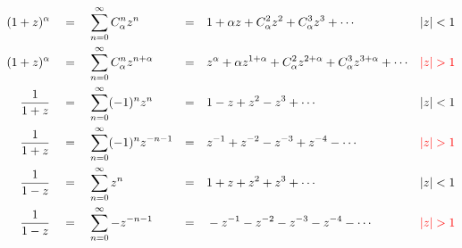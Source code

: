 \begin{align*}
    (1+z)^{\alpha} \quad&=\quad \sum_{n=0}^{\infty} C_\alpha^nz^n &=&\quad 1+\alpha z+C_\alpha^2z^2+C_\alpha^3z^3+\cdots & |z|<1 \\
    (1+z)^{\alpha} \quad&=\quad \sum_{n=0}^{\infty} C_\alpha^nz^{n+\alpha} &=&\quad z^{\alpha}+\alpha z^{1+\alpha}+C_\alpha^2z^{2+\alpha}+C_\alpha^3z^{3+\alpha}+\cdots & {\color{red}|z|>1} \\
    \frac{1}{1+z} \quad&=\quad \sum_{n=0}^{\infty}(-1)^nz^n &=&\quad 1-z+z^2-z^3+\cdots & |z|<1 \\
    \frac{1}{1+z} \quad&=\quad \sum_{n=0}^{\infty}(-1)^nz^{-n-1} &=&\quad z^{-1}+z^{-2}-z^{-3}+z^{-4}-\cdots & {\color{red}|z|>1} \\
    \frac{1}{1-z} \quad&=\quad \sum_{n=0}^{\infty}z^n &=&\quad 1+z+z^2+z^3+\cdots & |z|<1 \\
    \frac{1}{1-z} \quad&=\quad \sum_{n=0}^{\infty}-z^{-n-1} &=&\quad -z^{-1}-z^{-2}-z^{-3}-z^{-4}-\cdots & {\color{red}|z|>1} %
\end{align*}

